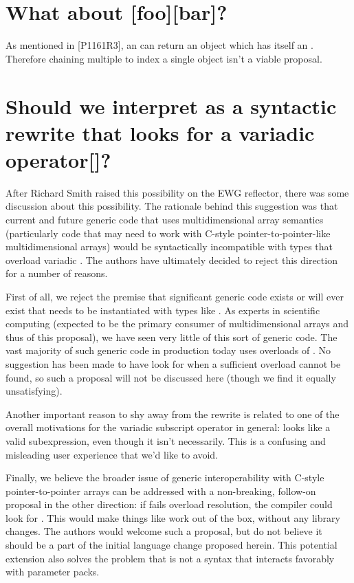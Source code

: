 \documentclass{wg21}
\begin{document}
\section{What about [foo][bar]?}

As mentioned in [P1161R3]\cite{P1161R3}, an  can return an object which has itself an .
Therefore chaining multiple \tcode{[]} to index a single object isn't a viable proposal.

\section{Should we interpret  as a syntactic rewrite that looks for a variadic operator[]?}

After Richard Smith raised this possibility on the EWG reflector, there was some discussion about this possibility. The rationale behind this suggestion was that current and future generic code that uses multidimensional array semantics (particularly code that may need to work with C-style pointer-to-pointer-like multidimensional arrays) would be syntactically incompatible with types that overload variadic .  The authors have ultimately decided to reject this direction for a number of reasons.

First of all, we reject the premise that significant generic code exists or will ever exist that needs to be instantiated with types like . As experts in scientific computing (expected to be the primary consumer of multidimensional arrays and thus of this proposal), we have seen very little of this sort of generic code. The vast majority of such generic code in production today uses overloads of . No suggestion has been made to have  look for  when a sufficient  overload cannot be found, so such a proposal will not be discussed here (though we find it equally unsatisfying).

Another important reason to shy away from the  rewrite is related to one of the overall motivations for the variadic subscript operator in general:  looks like a valid subexpression, even though it isn't necessarily.  This is a confusing and misleading user experience that we'd like to avoid. 

Finally, we believe the broader issue of generic interoperability with C-style pointer-to-pointer arrays can be addressed with a non-breaking, follow-on proposal in the other direction: if  fails overload resolution, the compiler could look for . This would make things like  work out of the box, without any library changes. The authors would welcome such a proposal, but do not believe it should be a part of the initial language change proposed herein. This potential extension also solves the problem that  is not a syntax that interacts favorably with parameter packs.
\end{document}
